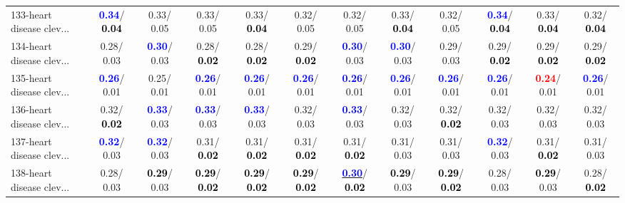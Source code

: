 \begin{table}[h]
\begin{center}
{\begin{tabular}{lc|c|c|c|c|c|c|c|c|c|c}
133-heart disease clev... & \textcolor{blue}{\textbf{  0.34}}/\textcolor{black}{\textbf{  0.04}} &   0.33/  0.05 &   0.33/  0.05 &   0.33/\textcolor{black}{\textbf{  0.04}} &   0.32/  0.05 &   0.32/  0.05 &   0.33/\textcolor{black}{\textbf{  0.04}} &   0.32/  0.05 & \textcolor{blue}{\textbf{  0.34}}/\textcolor{black}{\textbf{  0.04}} &   0.33/\textcolor{black}{\textbf{  0.04}} &   0.32/\textcolor{black}{\textbf{  0.04}} \\
134-heart disease clev... &   0.28/  0.03 & \textcolor{blue}{\textbf{  0.30}}/  0.03 &   0.28/\textcolor{black}{\textbf{  0.02}} &   0.28/\textcolor{black}{\textbf{  0.02}} &   0.29/\textcolor{black}{\textbf{  0.02}} & \textcolor{blue}{\textbf{  0.30}}/  0.03 & \textcolor{blue}{\textbf{  0.30}}/  0.03 &   0.29/  0.03 &   0.29/\textcolor{black}{\textbf{  0.02}} &   0.29/\textcolor{black}{\textbf{  0.02}} &   0.29/\textcolor{black}{\textbf{  0.02}} \\
135-heart disease clev... & \textcolor{blue}{\textbf{  0.26}}/  0.01 &   0.25/  0.01 & \textcolor{blue}{\textbf{  0.26}}/  0.01 & \textcolor{blue}{\textbf{  0.26}}/  0.01 & \textcolor{blue}{\textbf{  0.26}}/  0.01 & \textcolor{blue}{\textbf{  0.26}}/  0.01 & \textcolor{blue}{\textbf{  0.26}}/  0.01 & \textcolor{blue}{\textbf{  0.26}}/  0.01 & \textcolor{blue}{\textbf{  0.26}}/  0.01 & \textcolor{red}{\textbf{  0.24}}/  0.01 & \textcolor{blue}{\textbf{  0.26}}/  0.01 \\ \hline
136-heart disease clev... &   0.32/\textcolor{black}{\textbf{  0.02}} & \textcolor{blue}{\textbf{  0.33}}/  0.03 & \textcolor{blue}{\textbf{  0.33}}/  0.03 & \textcolor{blue}{\textbf{  0.33}}/  0.03 &   0.32/  0.03 & \textcolor{blue}{\textbf{  0.33}}/  0.03 &   0.32/  0.03 &   0.32/\textcolor{black}{\textbf{  0.02}} &   0.32/  0.03 &   0.32/  0.03 &   0.32/  0.03 \\
137-heart disease clev... & \textcolor{blue}{\textbf{  0.32}}/  0.03 & \textcolor{blue}{\textbf{  0.32}}/  0.03 &   0.31/\textcolor{black}{\textbf{  0.02}} &   0.31/\textcolor{black}{\textbf{  0.02}} &   0.31/\textcolor{black}{\textbf{  0.02}} &   0.31/\textcolor{black}{\textbf{  0.02}} &   0.31/  0.03 &   0.31/  0.03 & \textcolor{blue}{\textbf{  0.32}}/  0.03 &   0.31/\textcolor{black}{\textbf{  0.02}} &   0.31/  0.03 \\
138-heart disease clev... &   0.28/  0.03 & \textcolor{black}{\textbf{  0.29}}/  0.03 & \textcolor{black}{\textbf{  0.29}}/\textcolor{black}{\textbf{  0.02}} & \textcolor{black}{\textbf{  0.29}}/\textcolor{black}{\textbf{  0.02}} & \textcolor{black}{\textbf{  0.29}}/\textcolor{black}{\textbf{  0.02}} & \underline{\textcolor{blue}{\textbf{  0.30}}}/\textcolor{black}{\textbf{  0.02}} & \textcolor{black}{\textbf{  0.29}}/  0.03 & \textcolor{black}{\textbf{  0.29}}/\textcolor{black}{\textbf{  0.02}} &   0.28/  0.03 & \textcolor{black}{\textbf{  0.29}}/  0.03 &   0.28/\textcolor{black}{\textbf{  0.02}} \\

\end{tabular}}
\end{center}
\end{table}
